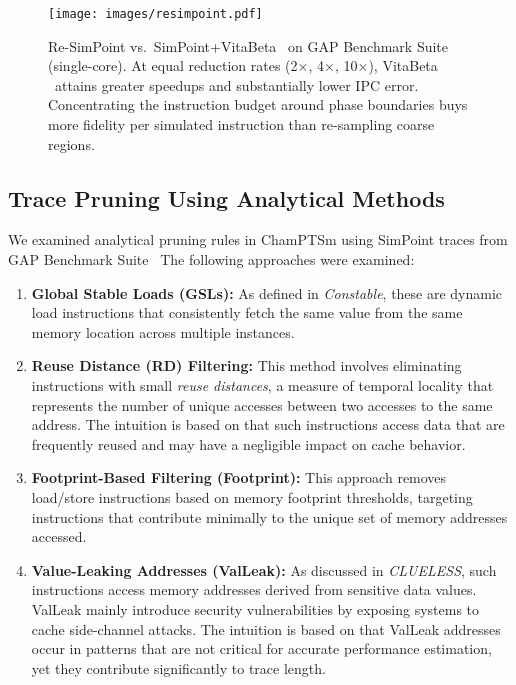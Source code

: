 \documentclass[conference]{IEEEtran}
\newcommand{\name}{VitaBeta }
\begin{document}
\begin{figure}[!htbp]
    \centering
    \setlength{\belowcaptionskip}{-10pt}
    \captionsetup{skip=0pt}
    \captionsetup[subfigure]{font=footnotesize, skip=1pt}
    \texttt{[image: images/resimpoint.pdf]}
    \caption{Re-SimPoint vs.\ SimPoint+\name\ on GAP Benchmark Suite (single-core). At equal reduction rates (2$\times$, 4$\times$, 10$\times$), \name\ attains greater speedups and substantially lower IPC error. Concentrating the instruction budget around phase boundaries buys more fidelity per simulated instruction than re-sampling coarse regions.}  
    \label{fig:benchmarks}
\end{figure}

\subsection*{Trace Pruning Using Analytical Methods}
We examined analytical pruning rules in ChamPTSm using SimPoint traces from GAP Benchmark Suite~\cite{beamer2017gapbenchmarksuite}  The following approaches were examined:
\begin{enumerate}[nosep, leftmargin=*]
    \item \textbf{Global Stable Loads (GSLs):} As defined in \textit{Constable}\cite{constable}, these are dynamic load instructions that consistently fetch the same value from the same memory location across multiple instances.  
    \item \textbf{Reuse Distance (RD) Filtering:} This method involves eliminating instructions with small \emph{reuse distances}, a measure of temporal locality that represents the number of unique accesses between two accesses to the same address. The intuition is based on that such instructions access  data that are frequently reused and may have a negligible impact on cache behavior.
    \item \textbf{Footprint-Based Filtering (Footprint):} This approach removes load/store instructions based on memory footprint thresholds, targeting instructions that contribute minimally to the unique set of memory addresses accessed.
    \item \textbf{Value-Leaking Addresses (ValLeak):} As discussed in \emph{CLUELESS}\cite{clueless}, such instructions access memory addresses derived from sensitive data values. ValLeak mainly introduce security vulnerabilities by exposing systems to cache side-channel attacks. { The intuition is based on that ValLeak addresses occur in patterns that are not critical for accurate performance estimation, yet they contribute significantly to trace length.}
\end{enumerate} 
\end{document}
